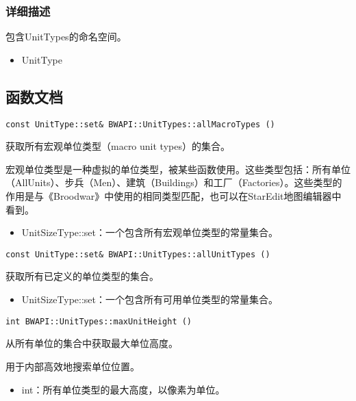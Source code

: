 \subsubsection{详细描述}
包含UnitTypes的命名空间。
\begin{refer}
\begin{itemize}
\item UnitType
\end{itemize}
\end{refer}


\subsection{函数文档}
\begin{tcolorbox}[colback=white, colframe=black!60!white, title=allMacroTypes(), arc=0mm]
\begin{verbatim}
const UnitType::set& BWAPI::UnitTypes::allMacroTypes ()
\end{verbatim}
获取所有宏观单位类型（macro unit types）的集合。\par
宏观单位类型是一种虚拟的单位类型，被某些函数使用。这些类型包括：所有单位（AllUnits）、步兵（Men）、建筑（Buildings）和工厂（Factories）。这些类型的作用是与《Broodwar》中使用的相同类型匹配，也可以在StarEdit地图编辑器中看到。
\begin{return}
\begin{itemize}
    \item UnitSizeType::set：一个包含所有宏观单位类型的常量集合。
\end{itemize}
\end{return}
\end{tcolorbox}

\begin{tcolorbox}[colback=white, colframe=black!60!white, title=allUnitTypes(), arc=0mm]
\begin{verbatim}
const UnitType::set& BWAPI::UnitTypes::allUnitTypes ()
\end{verbatim}
获取所有已定义的单位类型的集合。
\begin{return}
\begin{itemize}
    \item UnitSizeType::set：一个包含所有可用单位类型的常量集合。
\end{itemize}
\end{return}
\end{tcolorbox}

\begin{tcolorbox}[colback=white, colframe=black!60!white, title=maxUnitHeight(), arc=0mm]
\begin{verbatim}
int BWAPI::UnitTypes::maxUnitHeight ()
\end{verbatim}
从所有单位的集合中获取最大单位高度。\par 用于内部高效地搜索单位位置。
\begin{return}
\begin{itemize}
    \item int：所有单位类型的最大高度，以像素为单位。
\end{itemize}
\end{return}
\end{tcolorbox}

